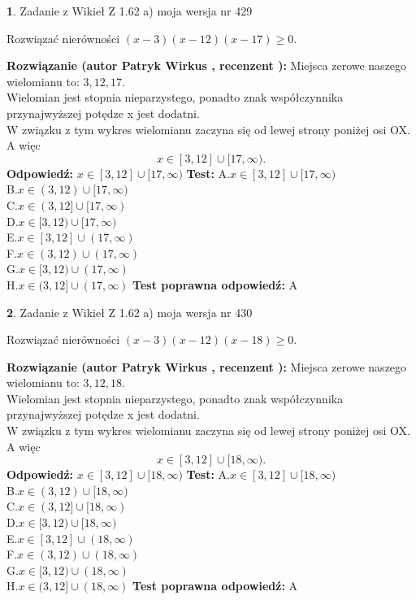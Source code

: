 \documentclass[12pt, a4paper]{article}
\theoremstyle{definition} %
\newtheorem{zad}{}
\newcommand{\zadStart}[1]{\begin{zad}#1\newline}
\newcommand{\zadStop}{\end{zad}}
\newcommand{\rozwStart}[2]{\noindent \textbf{Rozwiązanie (autor #1 , recenzent #2): }\newline}
\newcommand{\rozwStop}{\newline}
\newcommand{\odpStart}{\noindent \textbf{Odpowiedź:}\newline}
\newcommand{\odpStop}{\newline}
\newcommand{\testStart}{\noindent \textbf{Test:}\newline}
\newcommand{\testStop}{\newline}
\newcommand{\kluczStart}{\noindent \textbf{Test poprawna odpowiedź:}\newline}
\newcommand{\kluczStop}{\newline}
\begin{document}
\zadStart{Zadanie z Wikieł Z 1.62 a) moja wersja nr 429}

Rozwiązać nierówności $(x-3)(x-12)(x-17)\ge0$.
\zadStop
\rozwStart{Patryk Wirkus}{}
Miejsca zerowe naszego wielomianu to: $3, 12, 17$.\\
Wielomian jest stopnia nieparzystego, ponadto znak współczynnika przy\linebreak najwyższej potędze x jest dodatni.\\ W związku z tym wykres wielomianu zaczyna się od lewej strony poniżej osi OX. A więc $$x \in [3,12] \cup [17,\infty).$$
\rozwStop
\odpStart
$x \in [3,12] \cup [17,\infty)$
\odpStop
\testStart
A.$x \in [3,12] \cup [17,\infty)$\\
B.$x \in (3,12) \cup [17,\infty)$\\
C.$x \in (3,12] \cup [17,\infty)$\\
D.$x \in [3,12) \cup [17,\infty)$\\
E.$x \in [3,12] \cup (17,\infty)$\\
F.$x \in (3,12) \cup (17,\infty)$\\
G.$x \in [3,12) \cup (17,\infty)$\\
H.$x \in (3,12] \cup (17,\infty)$
\testStop
\kluczStart
A
\kluczStop



\zadStart{Zadanie z Wikieł Z 1.62 a) moja wersja nr 430}

Rozwiązać nierówności $(x-3)(x-12)(x-18)\ge0$.
\zadStop
\rozwStart{Patryk Wirkus}{}
Miejsca zerowe naszego wielomianu to: $3, 12, 18$.\\
Wielomian jest stopnia nieparzystego, ponadto znak współczynnika przy\linebreak najwyższej potędze x jest dodatni.\\ W związku z tym wykres wielomianu zaczyna się od lewej strony poniżej osi OX. A więc $$x \in [3,12] \cup [18,\infty).$$
\rozwStop
\odpStart
$x \in [3,12] \cup [18,\infty)$
\odpStop
\testStart
A.$x \in [3,12] \cup [18,\infty)$\\
B.$x \in (3,12) \cup [18,\infty)$\\
C.$x \in (3,12] \cup [18,\infty)$\\
D.$x \in [3,12) \cup [18,\infty)$\\
E.$x \in [3,12] \cup (18,\infty)$\\
F.$x \in (3,12) \cup (18,\infty)$\\
G.$x \in [3,12) \cup (18,\infty)$\\
H.$x \in (3,12] \cup (18,\infty)$
\testStop
\kluczStart
A
\kluczStop
\end{document}
